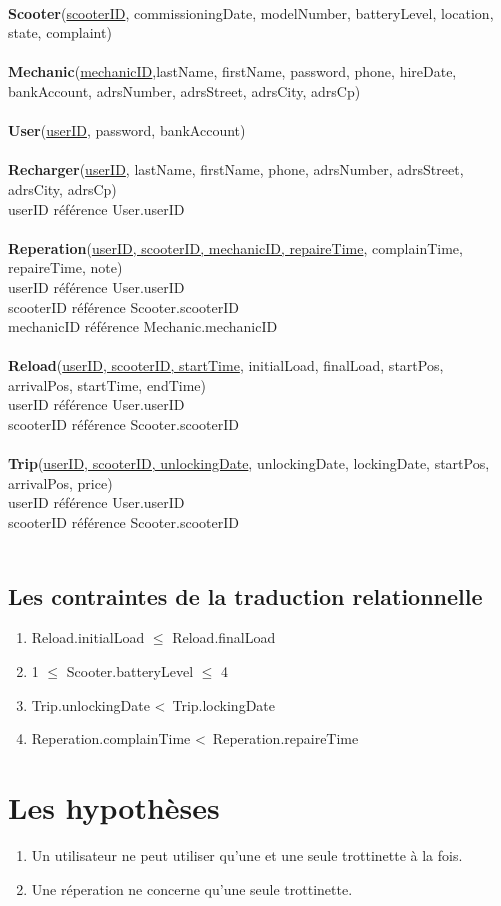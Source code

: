 \documentclass{article}
\begin{document}
\textbf{\\Scooter}(\underline{scooterID}, commissioningDate, modelNumber, batteryLevel, location, state, complaint)
\\\\
\textbf{Mechanic}(\underline{mechanicID},lastName, firstName, password, phone, hireDate, bankAccount, adrsNumber, adrsStreet, adrsCity, adrsCp)
\\\\
\textbf{User}(\underline{userID}, password, bankAccount)
\\\\
\textbf{Recharger}(\underline{userID}, lastName, firstName, phone, adrsNumber, adrsStreet, adrsCity, adrsCp) \\
userID référence User.userID
\\\\
\textbf{Reperation}(\underline{userID, scooterID, mechanicID, repaireTime}, complainTime, repaireTime, note) \\
userID référence User.userID\\
scooterID référence Scooter.scooterID\\
mechanicID référence Mechanic.mechanicID
\\\\
\textbf{Reload}(\underline{userID, scooterID, startTime}, initialLoad, finalLoad, startPos, arrivalPos, startTime, endTime) \\
userID référence User.userID\\
scooterID référence Scooter.scooterID\\
\\
\textbf{Trip}(\underline{userID, scooterID, unlockingDate}, unlockingDate, lockingDate, startPos, arrivalPos, price) \\
userID référence User.userID\\
scooterID référence Scooter.scooterID\\
\\

    
    \subsection{Les contraintes de la traduction relationnelle}
        \begin{enumerate}
            \item {Reload.initialLoad $\leq$ Reload.finalLoad}
            \item {1 $\leq$ Scooter.batteryLevel $\leq$ 4}
            \item { Trip.unlockingDate \textless\ Trip.lockingDate}
            \item {Reperation.complainTime \textless\ Reperation.repaireTime}
        \end{enumerate}

\section{Les hypothèses}
        \begin{enumerate}
            \item {Un utilisateur ne peut utiliser qu'une et une seule trottinette à la fois.}
            \item {Une réperation ne concerne qu'une seule trottinette.}
        \end{enumerate}
\end{document}
